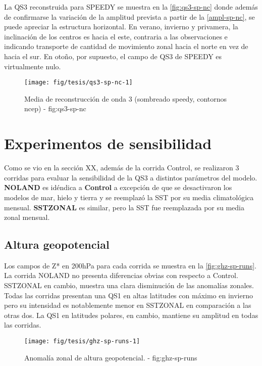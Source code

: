 \documentclass[spanish,a4paper,12p]{book}
\begin{document}
La QS3 reconstruida para SPEEDY se muestra en la \autoref{fig:qs3-sp-nc}
donde además de confirmarse la variación de la amplitud prevista a
partir de la \autoref{ampl-sp-nc}, se puede apreciar la estructura
horizontal. En verano, invierno y privamera, la inclinación de los
centros es hacia el este, contraria a las observaciones e indicando
transporte de cantidad de movimiento zonal hacia el norte en vez de
hacia el sur. En otoño, por supuesto, el campo de QS3 de SPEEDY es
virtualmente nulo.

\begin{figure*}
\texttt{[image: fig/tesis/qs3-sp-nc-1]} \caption{Media de reconstrucción de onda 3 (sombreado speedy, contornos ncep) - fig:qs3-sp-nc}\label{fig:qs3-sp-nc}
\end{figure*}

\section{Experimentos de
sensibilidad}\label{experimentos-de-sensibilidad}

Como se vio en la sección XX, además de la corrida Control, se
realizaron 3 corridas para evaluar la sensibilidad de la QS3 a distintos
parámetros del modelo. \textbf{NOLAND} es idéndica a \textbf{Control} a
excepción de que se desactivaron los modelos de mar, hielo y tierra y se
reemplazó la SST por su media climatológica mensual. \textbf{SSTZONAL}
es similar, pero la SST fue reemplazada por su media zonal mensual.

\subsection{Altura geopotencial}\label{altura-geopotencial-2}

Los campos de Z* en 200hPa para cada corrida se muestra en la
\autoref{fig:ghz-sp-runs}. La corrida NOLAND no presenta diferencias
obvias con respecto a Control. SSTZONAL en cambio, muestra una clara
disminución de las anomalías zonales. Todas las corridas presentan una
QS1 en altas latitudes con máximo en invierno pero su intensidad es
notablemente menor en SSTZONAL en comparación a las otras dos. La QS1 en
latitudes polares, en cambio, mantiene su amplitud en todas las
corridas.

\begin{landscape}\begin{figure}

{\centering \texttt{[image: fig/tesis/ghz-sp-runs-1]} 

}

\caption{Anomalía zonal de altura geopotencial. - fig:ghz-sp-runs}\label{fig:ghz-sp-runs}
\end{figure}
\end{landscape}
\end{document}
